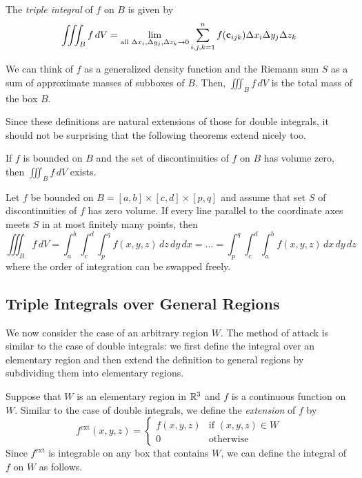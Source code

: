 \documentclass{article}
\begin{document}
\begin{definition}
  The \emph{triple integral} of $f$ on $B$ is given by
  \[
    \iiint_B f \, dV = \lim_{\text{all } \Delta x_i, \Delta y_j, \Delta z_k \to 0} \sum_{i, j, k = 1}^n f(\mathbf{c}_{ijk}) \Delta x_i \Delta y_j \Delta z_k
  \]
\end{definition}
We can think of $f$ as a generalized density function and the Riemann sum $S$ as a sum of approximate masses of subboxes of $B$. Then, $\iiint_B f \, dV$ is the total mass of the box $B$.

Since these definitions are natural extensions of those for double integrals, it should not be surprising that the following theorems extend nicely too.

\begin{theorem}
  If $f$ is bounded on $B$ and the set of discontinuities of $f$ on $B$ has volume zero, then $\iiint_B f \, dV$ exists.
\end{theorem}

\begin{theorem}
  Let $f$ be bounded on $B = [a, b] \times [c, d] \times [p, q]$ and assume that set $S$ of discontinuities of $f$ has zero volume.
  If every line parallel to the coordinate axes meets $S$ in at most finitely many points, then
  \[
    \iiint_B f \, dV = \int_a^b \int_c^d \int_p^q f(x, y, z) \, dz \, dy \, dx = \ldots = \int_p^q \int_c^d \int_a^b f(x, y, z) \, dx \, dy \, dz
  \]
  where the order of integration can be swapped freely.
\end{theorem}

\subsection{Triple Integrals over General Regions}

We now consider the case of an arbitrary region $W$.
The method of attack is similar to the case of double integrals: we first define the integral over an elementary region and then extend the definition to general regions by subdividing them into elementary regions.

Suppose that $W$ is an elementary region in $\mathbb{R}^3$ and $f$ is a continuous function on $W$.
Similar to the case of double integrals, we define the \emph{extension} of $f$ by
\[
  f^{\text{ext}}(x, y, z) = \begin{cases}
    f(x, y, z) & \text{if $(x, y, z) \in W$}
    \\
    0          & \text{otherwise}
  \end{cases}
\]
Since $f^{\text{ext}}$ is integrable on any box that contains $W$, we can define the integral of $f$ on $W$ as follows.
\end{document}
